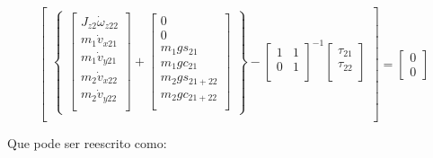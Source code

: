 \documentclass[12pt,a4paper]{article}
\begin{document}
\begin{equation}
\begin{bmatrix}
\begin{Bmatrix}
\begin{bmatrix}
		J_{z2} \dot{\omega}_{z22} \\
		m_1 \dot{v}_{x21} \\ 
		m_1 \dot{v}_{y21} \\
		m_2 \dot{v}_{x22} \\
		m_2 \dot{v}_{y22} \\
		\end{bmatrix}
				+
		\begin{bmatrix}
		0 \\
		0 \\
		m_1 g s_{21} \\
		m_1 g c_{21} \\
		m_2 g s_{21+22} \\
		m_2 g c_{21+22} \\
		\end{bmatrix}
	\end{Bmatrix}
	-
	\begin{bmatrix}
	1 & 1 \\
	0 & 1 \\
	\end{bmatrix}^{-1}
	\begin{bmatrix}
	\tau_{21} \\
	\tau_{22} \\
	\end{bmatrix}
	 \\
\end{bmatrix}
=
\begin{bmatrix}
0 \\
0
\end{bmatrix}
\end{equation}	

Que pode ser reescrito como:
\end{document}
